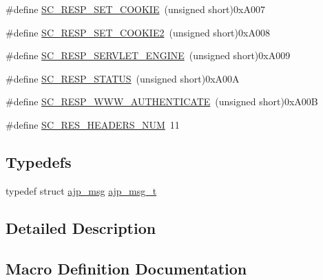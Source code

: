 \begin{DoxyCompactItemize}
\item 
\#define \hyperlink{group__AJP__defines_gaa3d32ee30bf7fdc3de127a3bd1fababb}{S\+C\+\_\+\+R\+E\+S\+P\+\_\+\+S\+E\+T\+\_\+\+C\+O\+O\+K\+IE}~(unsigned short)0x\+A007
\item 
\#define \hyperlink{group__AJP__defines_gacf629733e94bdc35ebe9a014e29a7e39}{S\+C\+\_\+\+R\+E\+S\+P\+\_\+\+S\+E\+T\+\_\+\+C\+O\+O\+K\+I\+E2}~(unsigned short)0x\+A008
\item 
\#define \hyperlink{group__AJP__defines_gad782554f636803bbc0c4e241d49411aa}{S\+C\+\_\+\+R\+E\+S\+P\+\_\+\+S\+E\+R\+V\+L\+E\+T\+\_\+\+E\+N\+G\+I\+NE}~(unsigned short)0x\+A009
\item 
\#define \hyperlink{group__AJP__defines_ga45eddd7dc4af0db53379512205fb8259}{S\+C\+\_\+\+R\+E\+S\+P\+\_\+\+S\+T\+A\+T\+US}~(unsigned short)0x\+A00A
\item 
\#define \hyperlink{group__AJP__defines_ga90bcf2a48f2fe3dc27be4e0fa1fc382e}{S\+C\+\_\+\+R\+E\+S\+P\+\_\+\+W\+W\+W\+\_\+\+A\+U\+T\+H\+E\+N\+T\+I\+C\+A\+TE}~(unsigned short)0x\+A00B
\item 
\#define \hyperlink{group__AJP__defines_ga9c0b406da640482b70e2776b13f1fe73}{S\+C\+\_\+\+R\+E\+S\+\_\+\+H\+E\+A\+D\+E\+R\+S\+\_\+\+N\+UM}~11
\end{DoxyCompactItemize}
\subsection*{Typedefs}
\begin{DoxyCompactItemize}
\item 
typedef struct \hyperlink{structajp__msg}{ajp\+\_\+msg} \hyperlink{group__AJP__defines_ga863bb515e9c32a605d3833fa88d9b643}{ajp\+\_\+msg\+\_\+t}
\end{DoxyCompactItemize}


\subsection{Detailed Description}


\subsection{Macro Definition Documentation}
